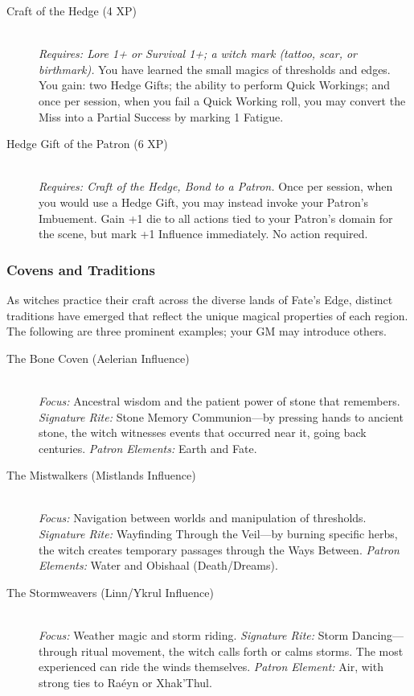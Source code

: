 \begin{description}
    \item[Craft of the Hedge (4 XP)] \hfill \\
    \textit{Requires: Lore 1+ or Survival 1+; a witch mark (tattoo, scar, or birthmark).} You have learned the small magics of thresholds and edges. You gain: two Hedge Gifts; the ability to perform Quick Workings; and once per session, when you fail a Quick Working roll, you may convert the Miss into a Partial Success by marking 1 Fatigue.

    \item[Hedge Gift of the Patron (6 XP)] \hfill \\
    \textit{Requires: Craft of the Hedge, Bond to a Patron.} Once per session, when you would use a Hedge Gift, you may instead invoke your Patron's Imbuement. Gain +1 die to all actions tied to your Patron's domain for the scene, but mark +1 Influence immediately. No action required.
\end{description}

\subsubsection{Covens and Traditions}

As witches practice their craft across the diverse lands of Fate's Edge, distinct traditions have emerged that reflect the unique magical properties of each region. The following are three prominent examples; your GM may introduce others.

\begin{description}
    \item[The Bone Coven (Aelerian Influence)] \hfill \\
    \textit{Focus:} Ancestral wisdom and the patient power of stone that remembers. \textit{Signature Rite:} Stone Memory Communion---by pressing hands to ancient stone, the witch witnesses events that occurred near it, going back centuries. \textit{Patron Elements:} Earth and Fate.

    \item[The Mistwalkers (Mistlands Influence)] \hfill \\
    \textit{Focus:} Navigation between worlds and manipulation of thresholds. \textit{Signature Rite:} Wayfinding Through the Veil---by burning specific herbs, the witch creates temporary passages through the Ways Between. \textit{Patron Elements:} Water and Obishaal (Death/Dreams).

    \item[The Stormweavers (Linn/Ykrul Influence)] \hfill \\
    \textit{Focus:} Weather magic and storm riding. \textit{Signature Rite:} Storm Dancing---through ritual movement, the witch calls forth or calms storms. The most experienced can ride the winds themselves. \textit{Patron Element:} Air, with strong ties to Raéyn or Xhak'Thul.
\end{description}

